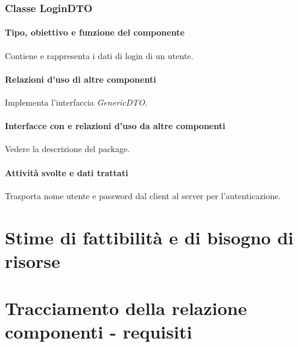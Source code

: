 \subsection{Classe LoginDTO}
\subsubsection*{Tipo, obiettivo e funzione del componente}
Contiene e rappresenta i dati di login di un utente.
\subsubsection*{Relazioni d'uso di altre componenti}
Implementa l'interfaccia \textit{GenericDTO}.
\subsubsection*{Interfacce con e relazioni d'uso da altre componenti}
Vedere la descrizione del package.
\subsubsection*{Attivit\`a svolte e dati trattati}
Trasporta nome utente e password dal client al server per l'autenticazione.


\chapter{Stime di fattibilit\`a e di bisogno di risorse}

\chapter{Tracciamento della relazione componenti - requisiti}

\listoftables
{}
\listoffigures
{}

